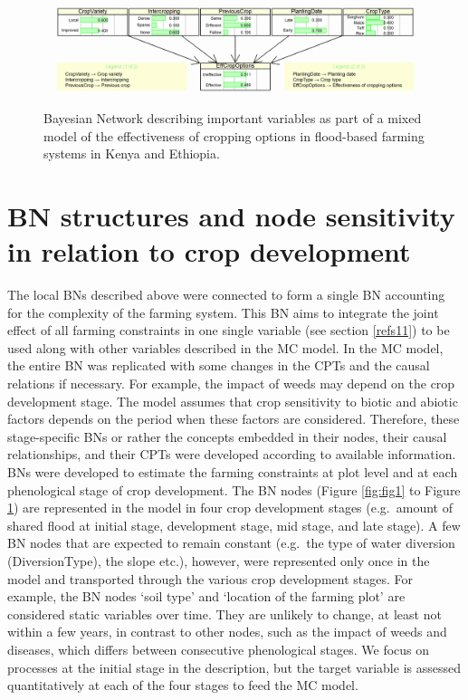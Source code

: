 \documentclass[]{elsarticle} %
\begin{document}
\begin{figure}[!h]

{\centering \includegraphics[width=1\linewidth,]{figures/figure_s6} 

}

\caption{Bayesian Network describing important variables as part of a mixed model of the effectiveness of cropping options in flood-based farming systems in Kenya and Ethiopia.}\label{fig:fig6}
\end{figure}

\hypertarget{refs2}{%
\section{BN structures and node sensitivity in relation to crop development}\label{refs2}}

The local BNs described above were connected to form a single BN accounting for the complexity of the farming system. This BN aims to integrate the joint effect of all farming constraints in one single variable (see section \ref{refs11}) to be used along with other variables described in the MC model. In the MC model, the entire BN was replicated with some changes in the CPTs and the causal relations if necessary. For example, the impact of weeds may depend on the crop development stage. The model assumes that crop sensitivity to biotic and abiotic factors depends on the period when these factors are considered. Therefore, these stage-specific BNs or rather the concepts embedded in their nodes, their causal relationships, and their CPTs were developed according to available information. BNs were developed to estimate the farming constraints at plot level and at each phenological stage of crop development. The BN nodes (Figure \ref{fig:fig1} to Figure \ref{fig:fig6}) are represented in the model in four crop development stages (e.g.~amount of shared flood at initial stage, development stage, mid stage, and late stage). A few BN nodes that are expected to remain constant (e.g.~the type of water diversion (DiversionType), the slope etc.), however, were represented only once in the model and transported through the various crop development stages. For example, the BN nodes `soil type' and `location of the farming plot' are considered static variables over time. They are unlikely to change, at least not within a few years, in contrast to other nodes, such as the impact of weeds and diseases, which differs between consecutive phenological stages. We focus on processes at the initial stage in the description, but the target variable is assessed quantitatively at each of the four stages to feed the MC model.
\end{document}
